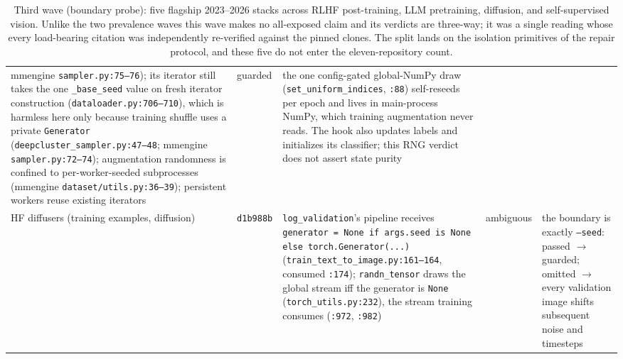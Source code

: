 \documentclass[10pt,letterpaper]{article}
\theoremstyle{remark}
\newcommand{\code}[1]{\texttt{#1}}
\begin{document}
\begin{table}[tbp]
\begin{tabular}{@{}L{2.3cm}L{1.15cm}L{6.55cm}L{1.35cm}L{3.6cm}@{}}
mmengine \code{sampler.py:75--76}); its iterator still takes the one
\code{\_base\_seed} value on fresh iterator construction
(\code{dataloader.py:706--710}), which is harmless here only because
training shuffle uses a private
\code{Generator} (\code{deepcluster\_sampler.py:47--48}; mmengine
\code{sampler.py:72--74}); augmentation randomness is confined to
per-worker-seeded subprocesses (mmengine \code{dataset/utils.py:36--39});
persistent workers reuse existing iterators &
guarded &
the one config-gated global-NumPy draw
(\code{set\_uniform\_indices}, \code{:88}) self-reseeds per epoch and
lives in main-process NumPy, which training augmentation never reads.
The hook also updates labels and initializes its classifier; this RNG
verdict does not assert state purity \\
\addlinespace
HF diffusers (training examples, diffusion) & \code{d1b988b} &
\code{log\_validation}'s pipeline receives
\code{generator = None if args.seed is None else torch.Generator(...)}
(\code{train\_text\_to\_image.py:161--164}, consumed \code{:174});
\code{randn\_tensor} draws the global stream iff the generator is
\code{None} (\code{torch\_utils.py:232}), the stream training
consumes (\code{:972}, \code{:982}) &
ambiguous &
the boundary is exactly \code{--seed}: passed $\to$ guarded; omitted
$\to$ every validation image shifts subsequent noise and timesteps \\
\bottomrule
\end{tabular}
\caption{Third wave (boundary probe): five flagship 2023--2026 stacks
across RLHF post-training, LLM pretraining, diffusion, and
self-supervised vision. Unlike the two prevalence waves this wave makes
no all-exposed claim and its verdicts are three-way; it was a single
reading whose every load-bearing citation was independently re-verified
against the pinned clones. The split lands on the isolation primitives
of the repair protocol, and these five do not enter the
eleven-repository count.}
\label{tab:modern}
\end{table}
\end{document}
